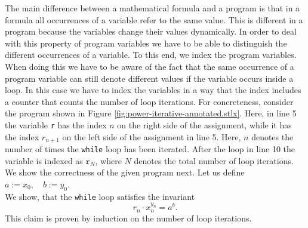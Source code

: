 The main difference between a mathematical formula and a program is that in a formula all
occurrences of a variable refer to the same value.   This is different in a program because the
variables change their values dynamically.  In order to deal with this property of program variables
we have to be able to distinguish the different occurrences of a variable.  To this end,  we 
index the program variables. 
When doing this we have to be aware of the fact that the same occurrence of a program variable can
still denote different values if the variable occurs inside  a loop.  In this case we have to index
the variables in a way that the index includes a counter that counts the number of loop iterations.
For concreteness, consider the  program shown in 
Figure \ref{fig:power-iterative-annotated.stlx}.  
Here, in line 5 the variable \texttt{r} has the index $n$ on the right side of the assignment,
while it has the index $r_{n+1}$ on the left side of the assignment in line 5.  Here, $n$ denotes 
the number of times the \texttt{while} loop has been iterated.
After the loop in line 10 the variable is indexed as
$\texttt{r}_N$, where $N$ denotes the total number of loop iterations.
We show the correctness of the given program next.  Let us define
\\[0.2cm]
\hspace*{1.3cm}
$ a := x_0, \quad b := y_0$.
\\[0.2cm]
We show, that the \texttt{while} loop satisfies the invariant
\begin{equation}
  \label{eq:powerInv}
   r_n \cdot x_n^{y_n} = a^b.
\end{equation}
This claim is proven by induction on the number of loop iterations.
